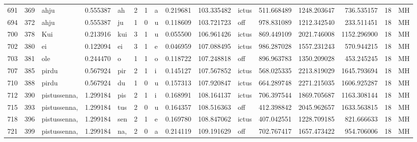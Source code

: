 \begin{tabular}{lrlrllllrrlrrrll}
691  &         369 &             ahju &  0.555387 &      ah &        2 &      1 &       a &      0.219681 &    103.335482 &  ictus &   511.668489 &  1248.203647 &   736.535157 &     18 &        MH \\
694  &         372 &             ahju &  0.555387 &      ju &        1 &      0 &       u &      0.118609 &    103.721723 &    off &   978.831089 &  1212.342540 &   233.511451 &     18 &        MH \\
700  &         378 &              Kui &  0.213916 &     kui &        3 &      1 &       u &      0.055500 &    106.961426 &  ictus &   869.449109 &  2021.746008 &  1152.296900 &     18 &        MH \\
702  &         380 &               ei &  0.122094 &      ei &        3 &      1 &       e &      0.046959 &    107.088495 &  ictus &   986.287028 &  1557.231243 &   570.944215 &     18 &        MH \\
703  &         381 &              ole &  0.244470 &       o &        1 &      1 &       o &      0.118722 &    107.248818 &    off &   896.963783 &  1350.209028 &   453.245245 &     18 &        MH \\
707  &         385 &            pirdu &  0.567924 &     pir &        2 &      1 &       i &      0.145127 &    107.567852 &  ictus &   568.025335 &  2213.819029 &  1645.793694 &     18 &        MH \\
710  &         388 &            pirdu &  0.567924 &      du &        1 &      0 &       u &      0.157313 &    107.920847 &  ictus &   664.289748 &  2271.215035 &  1606.925287 &     18 &        MH \\
712  &         390 &     pistussenna, &  1.299184 &     pis &        2 &      1 &       i &      0.168991 &    108.164137 &  ictus &   706.397544 &  1869.705687 &  1163.308144 &     18 &        MH \\
715  &         393 &     pistussenna, &  1.299184 &     tus &        2 &      0 &       u &      0.164357 &    108.516363 &    off &   412.398842 &  2045.962657 &  1633.563815 &     18 &        MH \\
718  &         396 &     pistussenna, &  1.299184 &     sen &        2 &      1 &       e &      0.169780 &    108.847062 &  ictus &   407.042551 &  1228.709185 &   821.666633 &     18 &        MH \\
721  &         399 &     pistussenna, &  1.299184 &     na, &        2 &      0 &       a &      0.214119 &    109.191629 &    off &   702.767417 &  1657.473422 &   954.706006 &     18 &        MH \\

\end{tabular}
